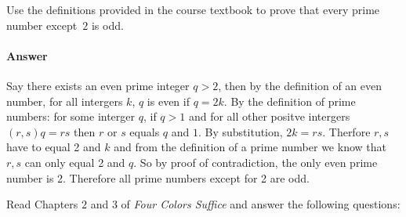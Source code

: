 \documentclass{article}
\begin{document}
 
Use the definitions provided in the course textbook to prove that every prime
number except~$2$ is odd.

\paragraph{Answer}

Say there exists an even prime integer $q>2$, then by the definition of an even number, for all intergers $k$, $q$ is even if $q=2k$. By the definition of prime numbers: for some interger $q$, if $q>1$ and for all other positve intergers $(r,s) q=rs$ then $r$ or $s$ equals $q$ and $1$. By substitution, $2k=rs$. Therfore $r,s$ have to equal 2 and $k$ and from the definition of a prime number we know that $r,s$ can only equal 2 and $q$. So by proof of contradiction, the only even prime number is 2. Therefore all prime numbers except for 2 are odd.

Read Chapters $2$ and $3$ of \emph{Four Colors Suffice} and answer the following questions:
\end{document}
